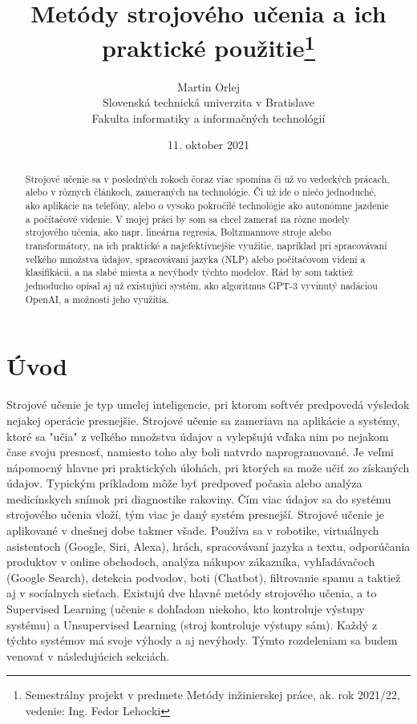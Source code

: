 \documentclass[8pt,twoside,slovak,a4paper]{article}
\title{Metódy strojového učenia a ich praktické použitie\thanks{Semestrálny projekt v predmete Metódy inžinierskej práce, ak. rok 2021/22, vedenie: Ing. Fedor Lehocki}}
\author{Martin Orlej\\[2pt]
	{\small Slovenská technická univerzita v Bratislave}\\
	{\small Fakulta informatiky a informačných technológií}\\
	}
\date{\small 11. oktober 2021}
\begin{document}
\maketitle

\begin{abstract}
Strojové učenie sa v posledných rokoch čoraz viac spomína či už vo vedeckých prácach, alebo v rôznych článkoch, zameraných na technológie. Či už ide o niečo jednoduché, ako aplikácie na telefóny, alebo o vysoko pokročilé technológie ako autonómne jazdenie a počítačové videnie. V mojej práci by som sa chcel zamerať na rôzne modely strojového učenia, ako napr. lineárna regresia, Boltzmannove stroje alebo transformátory, na ich praktické a najefektívnejšie využitie, napríklad pri spracovávaní veľkého množstva údajov, spracovávaní jazyka (NLP) alebo počítačovom videní a klasifikácii, a na slabé miesta a nevýhody týchto modelov. Rád by som taktiež jednoducho opísal aj už existujúci systém, ako algoritmus GPT-3 vyvinutý nadáciou OpenAI, a možnosti jeho využitia.
\end{abstract}






\section{Úvod} \label {uvod}
Strojové učenie je typ umelej inteligencie, pri ktorom softvér predpovedá výsledok nejakej operácie presnejšie. Strojové učenie sa zameriava na aplikácie a systémy, ktoré sa "učia" z veľkého množstva údajov a vylepšujú vďaka nim po nejakom čase svoju presnosť, namiesto toho aby boli natvrdo naprogramované. Je veľmi nápomocný hlavne pri praktických úlohách, pri ktorých sa može učiť zo získaných údajov. Typickým príkladom môže byť predpoveď počasia alebo analýza medicínskych snímok pri diagnostike rakoviny.
Čím viac údajov sa do systému strojového učenia vloží, tým viac je daný systém presnejší. Strojové učenie je aplikované  v dnešnej dobe takmer všade. Používa sa v robotike, virtuálnych asistentoch (Google, Siri, Alexa), hrách, spracovávaní jazyka a textu, odporúčania produktov v online obchodoch, analýza nákupov zákazníka, vyhľadávačoch (Google Search), detekcia podvodov, boti (Chatbot), filtrovanie spamu a taktiež aj v socíalnych sieťach. 
Existujú dve hlavné metódy strojového učenia, a to Supervised Learning (učenie s dohľadom niekoho, kto kontroluje výstupy systému) a Unsupervised Learning (stroj kontroluje výstupy sám). Každý z týchto systémov má svoje výhody a aj nevýhody. Týmto rozdeleniam sa budem venovať v následujúcich sekciách.
\end{document}
